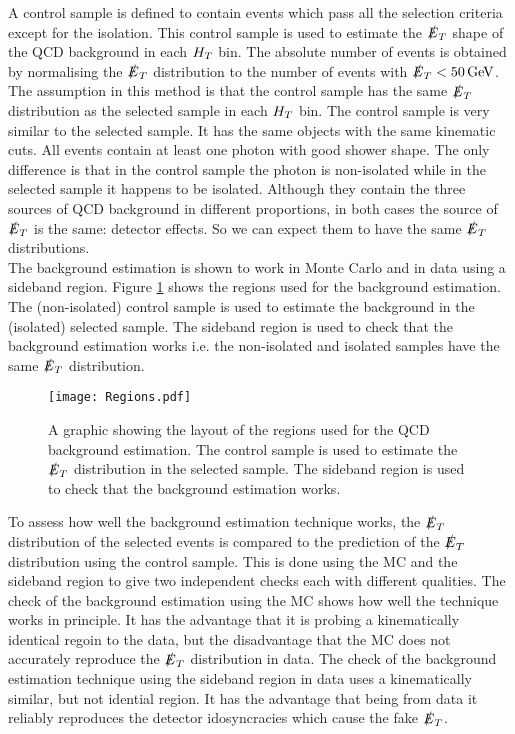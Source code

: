 A control sample is defined to contain events which pass all the selection 
criteria except for the isolation. This control sample is used to estimate the
$\slashed{E}_{T}$ shape of the QCD background in each $H_{T}$ bin. The absolute number of
events is obtained by normalising the $\slashed{E}_{T}$ distribution to the number of
events with $\slashed{E}_{T} < 50 \, \mathrm{GeV}$. \\

The assumption in this method is that the control sample has the same $\slashed{E}_{T}$
distribution as the selected sample in each $H_{T}$ bin. The control sample is
very similar to the selected sample. It has the same objects with the same
kinematic cuts. All events contain at least one photon with good shower shape.
The only difference is that in the control sample the photon is non-isolated
while in the selected sample it happens to be isolated. Although they contain
the three sources of QCD background in different proportions, in both cases the 
source of $\slashed{E}_{T}$ is the same: detector effects. So we can expect them to have 
the same $\slashed{E}_{T}$ distributions. \\

The background estimation is shown to work in Monte Carlo and in data using a 
sideband region. Figure \ref{fig:Regions} shows the regions used for the
background estimation. The (non-isolated) control sample is used to estimate the 
background in the (isolated) selected sample. The sideband region is used to
check that the background estimation works i.e. the non-isolated and isolated 
samples have the same $\slashed{E}_{T}$ distribution. \\

\begin{figure}
\begin{center}
\texttt{[image: Regions.pdf]}
\end{center}
\caption{A graphic showing the layout of the regions used for the QCD background
estimation. The control sample is used to estimate the $\slashed{E}_{T}$ distribution in
the selected sample. The sideband region is used to check that the background
estimation works.}
\label{fig:Regions}
\end{figure}

To assess how well the background estimation technique works, the $\slashed{E}_{T}$
distribution of the selected events is compared to the prediction of the 
$\slashed{E}_{T}$ distribution using the control sample. This is done using the MC and the
sideband region to give two independent checks each with different qualities.
The check of the background estimation using the MC shows how well the technique
works in principle. It has the advantage that it is probing a kinematically
identical regoin to the data, but the disadvantage that the MC does not
accurately reproduce the $\slashed{E}_{T}$ distribution in data. The check of the 
background estimation technique using the sideband region in data uses a 
kinematically similar, but not idential region. It has the advantage that being 
from data it reliably reproduces the detector idosyncracies which cause the fake 
$\slashed{E}_{T}$. \\

